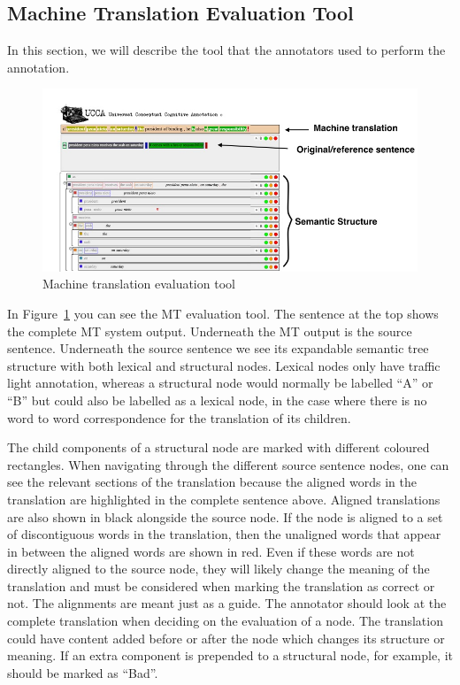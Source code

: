 \documentclass[11pt]{article}
\begin{document}
\subsection{Machine Translation Evaluation Tool}

In this section, we will describe the tool that the annotators used to perform the annotation. 

\begin{figure}[t]
    \includegraphics[width=1\textwidth]{interface-annotations}
    \caption{Machine translation evaluation tool}
    \label{mttool}
\end{figure}

In Figure~\ref{mttool} you can see the MT evaluation tool. The sentence at the top shows the complete MT system output. Underneath the MT output is the  source sentence.  Underneath the source sentence we see its expandable semantic tree structure with both lexical and structural nodes. Lexical nodes only have traffic light annotation, whereas a structural node would normally be labelled ``A'' or ``B'' but could also be labelled as a lexical node, in the case where there is no word to word correspondence for the translation of its children.

 The child components of a structural node are marked with different coloured rectangles. When navigating through the different source sentence nodes, one can see the relevant sections of the translation because the aligned words in the translation are highlighted in the complete sentence above. Aligned translations are also shown in black alongside the source node. If the node is aligned to a set of discontiguous words in the translation, then the unaligned words that appear in between the aligned words are shown in red. Even if these words are not directly aligned to the source node, they 
will likely change the meaning of the translation and must be considered when marking 
the translation as correct or not. The alignments are meant just as a guide. The annotator should  look at the complete translation when deciding on the evaluation of a node. The translation could have content added before or after the node which changes its
 structure or meaning. If an extra component is prepended to a structural node, for example, it should be marked as ``Bad''.
\end{document}
